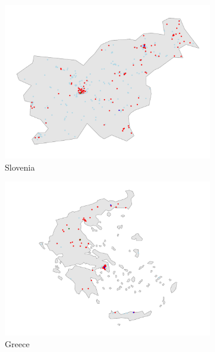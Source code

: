 \documentclass[12pt]{report}
\begin{document}
\begin{figure}[ht]
    \centering
    \begin{subfigure}[b]{0.45\textwidth}
        \centering
        \includegraphics[width=\linewidth]{../Output/SI_map.pdf}
        \caption{Slovenia}
        \label{fig:map_obs_SI}
    \end{subfigure}
    \hfill
    \begin{subfigure}[b]{0.45\textwidth}
        \centering
        \includegraphics[width=\linewidth]{../Output/EL_map.pdf}
        \caption{Greece}
        \label{fig:map_obs_EL}
    \end{subfigure}
    \vfill
    \begin{subfigure}[b]{0.45\textwidth}

\end{subfigure}
\end{figure}
\end{document}
